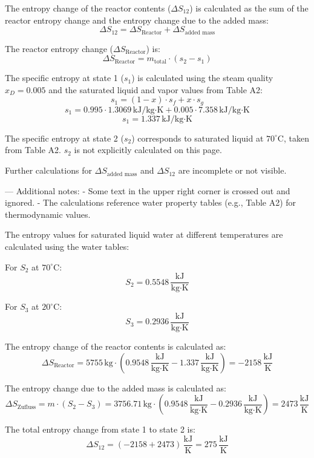 The entropy change of the reactor contents (\( \Delta S_{12} \)) is calculated as the sum of the reactor entropy change and the entropy change due to the added mass:  
\[
\Delta S_{12} = \Delta S_{\text{Reactor}} + \Delta S_{\text{added mass}}
\]  

The reactor entropy change (\( \Delta S_{\text{Reactor}} \)) is:  
\[
\Delta S_{\text{Reactor}} = m_{\text{total}} \cdot (s_2 - s_1)
\]  

The specific entropy at state 1 (\( s_1 \)) is calculated using the steam quality \( x_D = 0.005 \) and the saturated liquid and vapor values from Table A2:  
\[
s_1 = (1 - x) \cdot s_f + x \cdot s_g  
\]  
\[
s_1 = 0.995 \cdot 1.3069 \, \text{kJ/kg·K} + 0.005 \cdot 7.358 \, \text{kJ/kg·K}  
\]  
\[
s_1 = 1.337 \, \text{kJ/kg·K}
\]  

The specific entropy at state 2 (\( s_2 \)) corresponds to saturated liquid at \( 70^\circ \text{C} \), taken from Table A2. \( s_2 \) is not explicitly calculated on this page.  

Further calculations for \( \Delta S_{\text{added mass}} \) and \( \Delta S_{12} \) are incomplete or not visible.  

---  
Additional notes:  
- Some text in the upper right corner is crossed out and ignored.  
- The calculations reference water property tables (e.g., Table A2) for thermodynamic values.

The entropy values for saturated liquid water at different temperatures are calculated using the water tables:  

For \( S_2 \) at \( 70^\circ\text{C} \):  
\[
S_2 = 0.5548 \, \frac{\text{kJ}}{\text{kg·K}}
\]  

For \( S_3 \) at \( 20^\circ\text{C} \):  
\[
S_3 = 0.2936 \, \frac{\text{kJ}}{\text{kg·K}}
\]  

The entropy change of the reactor contents is calculated as:  
\[
\Delta S_{\text{Reactor}} = 5755 \, \text{kg} \cdot (0.9548 \, \frac{\text{kJ}}{\text{kg·K}} - 1.337 \, \frac{\text{kJ}}{\text{kg·K}}) = -2158 \, \frac{\text{kJ}}{\text{K}}
\]  

The entropy change due to the added mass is calculated as:  
\[
\Delta S_{\text{Zufluss}} = m \cdot (S_2 - S_3) = 3756.71 \, \text{kg} \cdot (0.9548 \, \frac{\text{kJ}}{\text{kg·K}} - 0.2936 \, \frac{\text{kJ}}{\text{kg·K}}) = 2473 \, \frac{\text{kJ}}{\text{K}}
\]  

The total entropy change from state 1 to state 2 is:  
\[
\Delta S_{12} = (-2158 + 2473) \, \frac{\text{kJ}}{\text{K}} = 275 \, \frac{\text{kJ}}{\text{K}}
\]